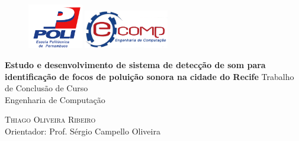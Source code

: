 \documentclass[
    12pt,               %
    openright,          %
    oneside,
    a4paper,            
    english,            %
    brazil              %
    ]{abntex2}
\begin{document}
\lstset{language=C, linewidth=6cm} 


\frenchspacing 


  \thispagestyle{empty}

  \begin{figure}[!htp]
    {\includegraphics[scale=0.2, width=2.4cm]{../imagens/poli.png}}\hfill%
    {\includegraphics[scale=0.3, width=3.7cm]{../imagens/ecomp.png}}%
  \end{figure}

  \begin{center}
      \vspace*{3.5cm}
      \Large\textbf{{Estudo e desenvolvimento de sistema de detecção de som para identificação de focos de poluição sonora na cidade do Recife}}
      \vskip 2cm
      \Large\textsf{Trabalho de Conclusão de Curso}\\[0.5cm]      
      \Large\textsf{Engenharia de Computação}
      \vskip 4.7cm
  \end{center}

  \begin{center}
    \large\textsc{{Thiago Oliveira Ribeiro}}\\
    \large{Orientador: Prof. Sérgio Campello Oliveira}
  \end{center}
\end{document}
